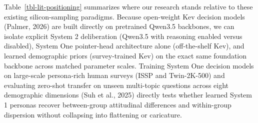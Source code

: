 \documentclass[
  11pt,
  letterpaper,
]{article}
\makeatletter
\newcommand\table@defaultsize{\footnotesize}
\let\table@size\table@defaultsize
\newcommand\nexttablesize[1]{\gdef\table@size{#1}}
\makeatother
\begin{document}
Table~\ref{tbl-lit-positioning} summarizes where our research stands
relative to these existing silicon-sampling paradigms. Because
open-weight Kev decision models (Palmer, 2026) are built directly on
pretrained Qwen3.5 backbones, we can isolate explicit System 2
deliberation (Qwen3.5 with reasoning enabled versus disabled), System
One pointer-head architecture alone (off-the-shelf Kev), and learned
demographic priors (survey-trained Kev) on the exact same foundation
backbone across matched parameter scales. Training System One decision
models on large-scale persona-rich human surveys (ISSP and Twin-2K-500)
and evaluating zero-shot transfer on unseen multi-topic questions across
eight demographic dimensions (Suh et al., 2025) directly tests whether
learned System 1 personas recover between-group attitudinal differences
and within-group dispersion without collapsing into flattening or
caricature.

\nexttablesize{\scriptsize}
\end{document}
